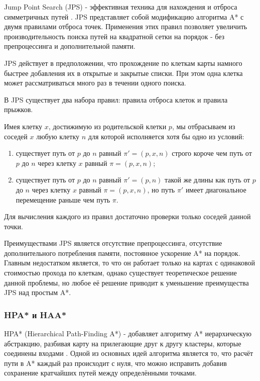 Jump Point Search (JPS) - эффективная техника для нахождения и отброса симметричных путей \cite{IMPROVING_JPS}. JPS представляет собой модификацию алгоритма A* с двумя правилами отброса точек. Применения этих правил позволяет увеличить производительность поиска путей на квадратной сетки на порядок - без препроцессинга и дополнительной памяти.

JPS действует в предположении, что прохождение по клеткам карты намного быстрее добавления их в открытые и закрытые списки. При этом одна клетка может рассматриваться много раз в течении одного поиска.

В JPS существует два набора правил: правила отброса клеток и правила прыжков.

Имея клетку $x$, достижимую из родительской клетки $p$, мы отбрасываем из соседей $x$ любую клетку $n$ для которой исполняется хотя бы одно из условий:

\begin{enumerate}
	\item существует путь от $p$ до $n$ равный $\pi'=(p,x,n)$ строго короче чем путь от $p$ до $n$ через клетку $x$ равный $\pi=(p,x,n)$;
	\item существует путь от $p$ до $n$ равный $\pi'=(p,n)$ такой же длины как путь от $p$ до $n$ через клетку $x$ равный $\pi=(p,x,n)$, но путь $\pi'$ имеет диагональное перемещение раньше чем путь $\pi$. 
\end{enumerate}

Для вычисления каждого из правил достаточно проверки только соседей данной точки.  



Преимуществами JPS является отсутствие препроцессинга, отсутствие дополнительного потребления памяти, постоянное ускорение A* на порядок. Главным недостатком является, то что он работает только на картах с одинаковой стоимостью прохода по клеткам, однако существует теоретическое решение данной проблемы, но любое её решение приводит к уменьшение преимущества JPS над простым A*.

\subsubsection{HPA* и HAA*}

HPA* (Hierarchical Path-Finding A*) - добавляет алгоритму A* иерархическую абстракцию, разбивая карту на прилегающие друг к другу кластеры, которые соединены входами \cite{HPA}. Одной из основных идей алгоритма является то, что расчёт пути в A* каждый раз происходит с нуля, что можно исправить добавив сохранение кратчайших путей между определёнными точками. 

